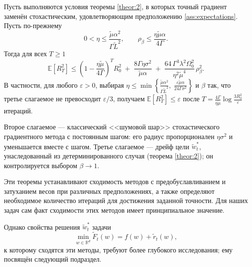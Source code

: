 \begin{theorem}
\label{theor:4}
    Пусть выполняются условия теоремы \ref{theor:2}, в которых точный градиент заменён стохастическим, удовлетворяющим предположению \ref{ass:expectations}. Пусть по-прежнему
    \begin{equation*}
        0 < \eta \le \frac{\widetilde{\mu}\alpha^2}{\Gamma \widetilde{L}^2}, \qquad \rho_\beta \le \frac{\eta\widetilde{\mu}\alpha}{4\Gamma}.
    \end{equation*}
    Тогда для всех $T \ge 1$
    \begin{equation*}
        \mathbb{E} \left[ R_T^2 \right] \le \left(1 - \frac{\eta\widetilde{\mu}}{4\Gamma}\right)^T R_0^2 \;+\; \frac{8\Gamma\eta\sigma^2}{\widetilde{\mu}\alpha} \;+\; \frac{64\,\Gamma^3\lambda^2\Omega_0^2}{\eta^2\widetilde{\mu}^4}\,\rho_\beta^2.
    \end{equation*}
    В частности, для любого $\varepsilon > 0$, выбирая
    $\eta \le \min\left\{ \frac{\widetilde{\mu}\alpha^2}{\Gamma\widetilde{L}^2},\; \frac{\varepsilon\widetilde{\mu}\alpha}{24\Gamma\sigma^2} \right\}$ и $\beta$ так, что третье слагаемое не превосходит $\varepsilon/3$, получаем $\mathbb{E}[R_T^2] \le \varepsilon$ после
    $T = \frac{4\Gamma}{\eta\widetilde{\mu}}\log\frac{3R_0^2}{\varepsilon}$ итераций.
\end{theorem}

\begin{note}
Второе слагаемое --- классический <<шумовой шар>> стохастического градиентного метода с постоянным шагом: его радиус пропорционален $\eta\sigma^2$ и уменьшается вместе с шагом. Третье слагаемое --- дрейф цели $\widetilde{w}^*_t$, унаследованный из детерминированного случая (теорема \ref{theor:2}); он контролируется выбором $\beta \to 1$.
\end{note}

Эти теоремы устанавливают сходимость методов с предобуславливанием и затуханием весов при различных предположениях, а также определяют необходимое количество итераций для достижения заданной точности. Для наших задач сам факт сходимости этих методов имеет принципиальное значение.

Однако свойства решения $\widetilde{w}^*_t$ задачи
\begin{equation} \label{F_tilde_problem}
	\min_{w \in \mathbb{R}^d} \widetilde{F}_t(w) = f(w) + \widetilde{r}_t(w),
\end{equation}
к которому сходятся эти методы, требуют более глубокого исследования; ему посвящён следующий подраздел.
